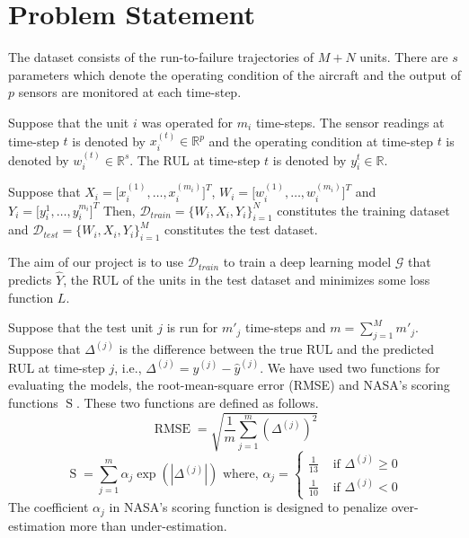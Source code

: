 \documentclass[a4paper,12pt]{article}
\DeclareMathOperator{\rmse}{RMSE}
\DeclareMathOperator{\nasa}{S}
\begin{document}

\section{Problem Statement}

The dataset consists of the run-to-failure trajectories of $M+N$ units. There
are $s$ parameters which denote the operating condition of the aircraft and the
output of $p$ sensors are monitored at each time-step.

Suppose that the unit $i$ was operated for $m_i$ time-steps. The sensor
readings at time-step $t$ is denoted by $x_{i}^{(t)} \in \mathbb{R}^{p}$ and the
operating condition at time-step $t$ is denoted by
$w_{i}^{(t)} \in \mathbb{R}^{s}$. The RUL at time-step $t$ is denoted by
$y_{i}^{t} \in \mathbb{R}$.

Suppose that $X_i = \lbrack x_{i}^{(1)}, \ldots, x_{i}^{(m_i)} \rbrack^{T}$,
$W_i = \lbrack w_{i}^{(1)}, \ldots, w_{i}^{(m_i)} \rbrack^{T}$ and
$Y_i = \lbrack y_{i}^{1}, \ldots, y_{i}^{m_i} \rbrack^{T}$ Then,
$\mathcal{D}_{train} = \{W_i, X_i, Y_i\}_{i=1}^{N}$ constitutes the training
dataset and $\mathcal{D}_{test} = \{W_i, X_i, Y_i\}_{i=1}^{M}$ constitutes the
test dataset.

The aim of our project is to use $\mathcal{D}_{train}$ to train a deep learning
model $\mathcal{G}$ that predicts $\hat{Y}$, the RUL of the units in the test
dataset and minimizes some loss function $L$.

Suppose that the test unit $j$ is run for $m'_{j}$ time-steps and
$m = \sum_{j=1}^{M} m'_{j}$. Suppose that $\Delta^{(j)}$ is the difference
between the true RUL and the predicted RUL at time-step $j$, i.e.,
$\Delta^{(j)} = y^{(j)} - \hat{y}^{(j)}$. We have used two functions for
evaluating the models, the root-mean-square error (RMSE) and NASA's scoring
functions $\nasa$. These two functions are defined as follows.
\[ \rmse = \sqrt{\frac{1}{m}\sum_{j=1}^{m}(\Delta^{(j)})^2} \]
\[ \nasa = \sum_{j=1}^{m}\alpha_{j}\exp(|\Delta^{(j)}|) \mbox{ where, } \alpha_{j} = 
\left\{ \begin{array}{ll}
\frac{1}{13} & \mbox{ if } \Delta^{(j)} \geq 0 \\
\frac{1}{10} & \mbox{ if } \Delta^{(j)} < 0 \end{array} \right.\]
The coefficient $\alpha_{j}$ in NASA's scoring function is designed to penalize
over-estimation more than under-estimation.
\end{document}

